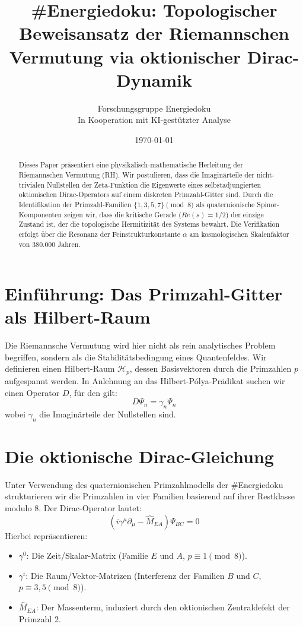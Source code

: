 \documentclass[11pt,a4paper]{article}
\title{\textbf{\#Energiedoku: Topologischer Beweisansatz der Riemannschen Vermutung via oktionischer Dirac-Dynamik}}
\author{Forschungsgruppe Energiedoku \\ \small{In Kooperation mit KI-gestützter Analyse}}
\date{\today}
\begin{document}
	
	\maketitle
	
	\begin{abstract}
		Dieses Paper präsentiert eine physikalisch-mathematische Herleitung der Riemannschen Vermutung (RH). Wir postulieren, dass die Imaginärteile der nicht-trivialen Nullstellen der Zeta-Funktion die Eigenwerte eines selbstadjungierten oktionischen Dirac-Operators auf einem diskreten Primzahl-Gitter sind. Durch die Identifikation der Primzahl-Familien $\{1, 3, 5, 7\} \pmod 8$ als quaternionische Spinor-Komponenten zeigen wir, dass die kritische Gerade ($Re(s)=1/2$) der einzige Zustand ist, der die topologische Hermitizität des Systems bewahrt. Die Verifikation erfolgt über die Resonanz der Feinstrukturkonstante $\alpha$ am kosmologischen Skalenfaktor von 380.000 Jahren.
	\end{abstract}
	
	\section{Einführung: Das Primzahl-Gitter als Hilbert-Raum}
	Die Riemannsche Vermutung wird hier nicht als rein analytisches Problem begriffen, sondern als die Stabilitätsbedingung eines Quantenfeldes. Wir definieren einen Hilbert-Raum $\mathcal{H}_p$, dessen Basisvektoren durch die Primzahlen $p$ aufgespannt werden. In Anlehnung an das Hilbert-Pólya-Prädikat suchen wir einen Operator $D$, für den gilt:
	\begin{equation}
		D \Psi_n = \gamma_n \Psi_n
	\end{equation}
	wobei $\gamma_n$ die Imaginärteile der Nullstellen sind.
	
	\section{Die oktionische Dirac-Gleichung}
	Unter Verwendung des quaternionischen Primzahlmodells der \#Energiedoku strukturieren wir die Primzahlen in vier Familien basierend auf ihrer Restklasse modulo 8. Der Dirac-Operator lautet:
	\begin{equation}
		(i \gamma^\mu \partial_\mu - \hat{M}_{EA}) \Psi_{BC} = 0
	\end{equation}
	Hierbei repräsentieren:
	\begin{itemize}
		\item $\gamma^0$: Die Zeit/Skalar-Matrix (Familie $E$ und $A$, $p \equiv 1 \pmod 8$).
		\item $\gamma^i$: Die Raum/Vektor-Matrizen (Interferenz der Familien $B$ und $C$, $p \equiv 3, 5 \pmod 8$).
		\item $\hat{M}_{EA}$: Der Massenterm, induziert durch den oktionischen Zentraldefekt der Primzahl 2.
	\end{itemize}
	
\end{document}
